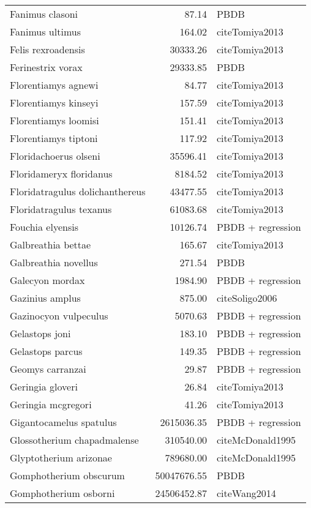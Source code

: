 \begin{table}[ht]
\begin{tabular}{lrl}
  Fanimus clasoni & 87.14 & PBDB \\ 
  Fanimus ultimus & 164.02 & cite{Tomiya2013} \\ 
  Felis rexroadensis & 30333.26 & cite{Tomiya2013} \\ 
  Ferinestrix vorax & 29333.85 & PBDB \\ 
  Florentiamys agnewi & 84.77 & cite{Tomiya2013} \\ 
  Florentiamys kinseyi & 157.59 & cite{Tomiya2013} \\ 
  Florentiamys loomisi & 151.41 & cite{Tomiya2013} \\ 
  Florentiamys tiptoni & 117.92 & cite{Tomiya2013} \\ 
  Floridachoerus olseni & 35596.41 & cite{Tomiya2013} \\ 
  Floridameryx floridanus & 8184.52 & cite{Tomiya2013} \\ 
  Floridatragulus dolichanthereus & 43477.55 & cite{Tomiya2013} \\ 
  Floridatragulus texanus & 61083.68 & cite{Tomiya2013} \\ 
  Fouchia elyensis & 10126.74 & PBDB + regression \\ 
  Galbreathia bettae & 165.67 & cite{Tomiya2013} \\ 
  Galbreathia novellus & 271.54 & PBDB \\ 
  Galecyon mordax & 1984.90 & PBDB + regression \\ 
  Gazinius amplus & 875.00 & cite{Soligo2006} \\ 
  Gazinocyon vulpeculus & 5070.63 & PBDB + regression \\ 
  Gelastops joni & 183.10 & PBDB + regression \\ 
  Gelastops parcus & 149.35 & PBDB + regression \\ 
  Geomys carranzai & 29.87 & PBDB + regression \\ 
  Geringia gloveri & 26.84 & cite{Tomiya2013} \\ 
  Geringia mcgregori & 41.26 & cite{Tomiya2013} \\ 
  Gigantocamelus spatulus & 2615036.35 & PBDB + regression \\ 
  Glossotherium chapadmalense & 310540.00 & cite{McDonald1995} \\ 
  Glyptotherium arizonae & 789680.00 & cite{McDonald1995} \\ 
  Gomphotherium obscurum & 50047676.55 & PBDB \\ 
  Gomphotherium osborni & 24506452.87 & cite{Wang2014} \\ 

\end{tabular}
\end{table}
